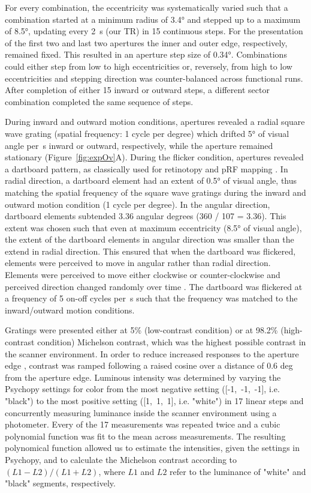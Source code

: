 For every combination, the eccentricity was systematically varied such that a combination started at a minimum radius of 3.4° and stepped up to a maximum of 8.5°, updating every 2~s (our TR) in 15 continuous steps. For the presentation of the first two and last two apertures the inner and outer edge, respectively, remained fixed. This resulted in an aperture step size of 0.34°. Combinations could either step from low to high eccentricities or, reversely, from high to low eccentricities and stepping direction was counter-balanced across functional runs. After completion of either 15 inward or outward steps, a different sector combination completed the same sequence of steps.

During inward and outward motion conditions, apertures revealed a radial square wave grating (spatial frequency: 1 cycle per degree) which drifted 5° of visual angle per~s inward or outward, respectively, while the aperture remained stationary (Figure~\ref{fig:expOv}A). During the flicker condition, apertures revealed a dartboard pattern, as classically used for retinotopy and pRF mapping \parencite{Dumoulin2008}. In radial direction, a dartboard element had an extent of 0.5° of visual angle, thus matching the spatial frequency of the square wave gratings during the inward and outward motion condition (1 cycle per degree). In the angular direction, dartboard elements subtended 3.36 angular degrees (360 / 107 = 3.36). This extent was chosen such that even at maximum eccentricity (8.5° of visual angle), the extent of the dartboard elements in angular direction was smaller than the extend in radial direction. This ensured that when the dartboard was flickered, elements were perceived to move in angular rather than radial direction. Elements were perceived to move either clockwise or counter-clockwise and perceived direction changed randomly over time \parencite{Amano2009}. The dartboard was flickered at a frequency of 5 on-off cycles per~s such that the frequency was matched to the inward/outward motion conditions.

Gratings were presented either at 5\% (low-contrast condition) or at 98.2\% (high-contrast condition) Michelson contrast, which was the highest possible contrast in the scanner environment. In order to reduce increased responses to the aperture edge \parencite{Wang2014, Schellekens2016}, contrast was ramped following a raised cosine over a distance of 0.6 deg from the aperture edge. Luminous intensity was determined by varying the Psychopy settings for color from the most negative setting ([-1,~-1,~-1], i.e. "black") to the most positive setting ([1,~1,~1], i.e. "white") in 17 linear steps and concurrently measuring luminance inside the scanner environment using a photometer. Every of the 17 measurements was repeated twice and a cubic polynomial function was fit to the mean across measurements. The resulting polynomical function allowed us to estimate the intensities, given the settings in Psychopy, and to calculate the Michelson contrast according to $(L1-L2) / (L1+L2)$, where $L1$ and $L2$ refer to the luminance of "white" and "black" segments, respectively.

